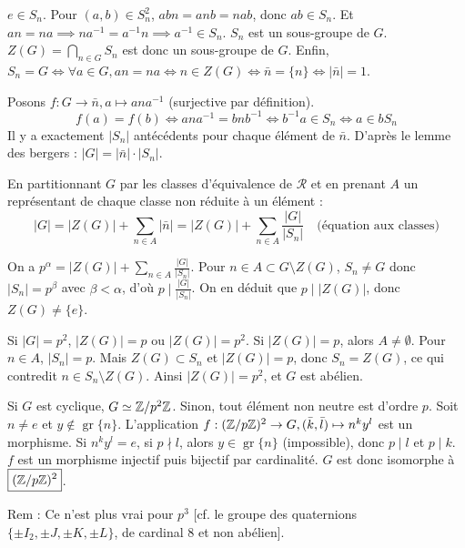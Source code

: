\begin{solution}
$e \in S_n$. Pour $(a,b) \in S_n^2$, $abn = anb = nab$, donc $ab \in S_n$.
Et $an = na \implies n a^{-1} = a^{-1} n \implies a^{-1} \in S_n$. $S_n$ est un sous-groupe de $G$.
$Z(G) = \bigcap_{n \in G} S_n$ est donc un sous-groupe de $G$.
Enfin, $S_n = G \iff \forall a \in G, an = na \iff n \in Z(G) \iff \bar{n} = \{n\} \iff |\bar{n}| = 1$.

Posons $f : G \to \bar{n}, a \mapsto a n a^{-1}$ (surjective par définition).
\[ f(a) = f(b) \iff a n a^{-1} = b n b^{-1} \iff b^{-1} a \in S_n \iff a \in b S_n \]
Il y a exactement $|S_n|$ antécédents pour chaque élément de $\bar{n}$.
D'après le lemme des bergers : $\boxed{|G| = |\bar{n}| \cdot |S_n|}$.

En partitionnant $G$ par les classes d'équivalence de $\mathcal{R}$ et en prenant $A$ un représentant de chaque classe non réduite à un élément :
\[ |G| = |Z(G)| + \sum_{n \in A} |\bar{n}| = |Z(G)| + \sum_{n \in A} \frac{|G|}{|S_n|} \quad \text{(équation aux classes)} \]

On a $p^\alpha = |Z(G)| + \sum_{n \in A} \frac{|G|}{|S_n|}$.
Pour $n \in A \subset G \setminus Z(G)$, $S_n \neq G$ donc $|S_n| = p^\beta$ avec $\beta < \alpha$, d'où $p \mid \frac{|G|}{|S_n|}$.
On en déduit que $p \mid |Z(G)|$, donc $\boxed{Z(G) \neq \{e\}}$.

Si $|G| = p^2$, $|Z(G)| = p$ ou $|Z(G)| = p^2$.
Si $|Z(G)| = p$, alors $A \neq \emptyset$. Pour $n \in A$, $|S_n| = p$. Mais $Z(G) \subset S_n$ et $|Z(G)| = p$, donc $S_n = Z(G)$, ce qui contredit $n \in S_n \setminus Z(G)$.
Ainsi $|Z(G)| = p^2$, et $G$ est abélien.

Si $G$ est cyclique, $G \simeq \mathbb Z/p^2\mathbb Z$.
Sinon, tout élément non neutre est d'ordre $p$. Soit $n \neq e$ et $y \notin \operatorname{gr}\{n\}$.
L'application $f : (\mathbb Z/p\mathbb Z)^2 \to G, (\bar{k}, \bar{l}) \mapsto n^k y^l$ est un morphisme.
Si $n^k y^l = e$, si $p \nmid l$, alors $y \in \operatorname{gr}\{n\}$ (impossible), donc $p \mid l$ et $p \mid k$.
$f$ est un morphisme injectif puis bijectif par cardinalité.
$G$ est donc isomorphe à $\boxed{(\mathbb Z/p\mathbb Z)^2}$.

\begin{remarkbox}
Rem : Ce n'est plus vrai pour $p^3$ [cf. le groupe des quaternions $\{\pm I_2, \pm J, \pm K, \pm L\}$, de cardinal 8 et non abélien].
\end{remarkbox}
\end{solution}

